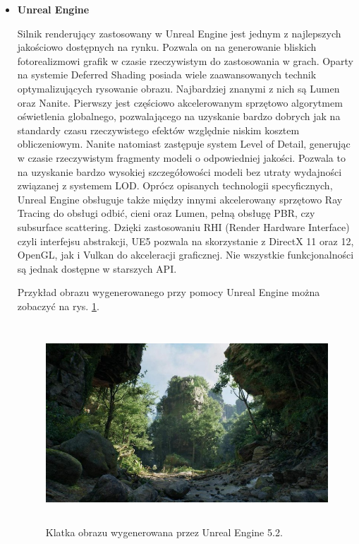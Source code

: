 \begin{itemize}
	\vfill
	\clearpage

	\item \textbf{Unreal Engine}
	
	Silnik renderujący zastosowany w Unreal Engine jest jednym z najlepszych jakościowo dostępnych na rynku. Pozwala on na generowanie bliskich fotorealizmowi grafik w czasie rzeczywistym do zastosowania w grach. Oparty na systemie Deferred Shading posiada wiele zaawansowanych technik optymalizujących rysowanie obrazu. Najbardziej znanymi z nich są Lumen oraz Nanite. Pierwszy jest częściowo akcelerowanym sprzętowo algorytmem oświetlenia globalnego, pozwalającego na uzyskanie bardzo dobrych jak na standardy czasu rzeczywistego efektów względnie niskim kosztem obliczeniowym. Nanite natomiast zastępuje system Level of Detail, generując w czasie rzeczywistym fragmenty modeli o odpowiedniej jakości. Pozwala to na uzyskanie bardzo wysokiej szczegółowości modeli bez utraty wydajności związanej z systemem LOD. Oprócz opisanych technologii specyficznych, Unreal Engine obsługuje także między innymi akcelerowany sprzętowo Ray Tracing do obsługi odbić, cieni oraz Lumen, pełną obsługę PBR, czy subsurface scattering. Dzięki zastosowaniu RHI (Render Hardware Interface) czyli interfejsu abstrakcji, UE5 pozwala na skorzystanie z DirectX 11 oraz 12, OpenGL, jak i Vulkan do akceleracji graficznej. Nie wszystkie funkcjonalności są jednak dostępne w starszych API. 
	
	Przykład obrazu wygenerowanego przy pomocy Unreal Engine można zobaczyć na rys. \ref{intro-unreal-engine}.

	\begin{figure}[htbp]
		\centering
		\includegraphics[width=5.21482in,height=2.93333in]{images/17_Unreal_engine_5_2.jpg}
		\caption{Klatka obrazu wygenerowana przez Unreal Engine 5.2.}
		\label{intro-unreal-engine}
	\end{figure}


\end{itemize}
